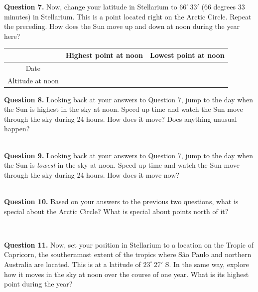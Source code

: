 \documentclass[11pt]{article}
\begin{document}
\textbf{Question 7.} 
Now, change your latitude in Stellarium to $66^\circ\,33'$ (66 degrees 33 minutes) in Stellarium. This is a point located right on the Arctic Circle. Repeat the preceding. How does the 
Sun move up and down at noon during the year here?
\renewcommand{\arraystretch}{2}
\vspace{1cm}
\begin{center}
\begin{tabular}{|c| c |c|}
\hline 
& Highest point at noon & Lowest point at noon \\
\hline
Date & & \\
\hline
Altitude at noon & & \\
\hline
\end{tabular}
\normalsize
\end{center}
\textbf{Question 8.} 
Looking back at your answers to Question 7, jump to the day when the Sun is highest in the sky at noon. Speed up time and watch
the Sun move through the sky during 24 hours. How does it move? Does anything unusual happen?


\vspace*{2cm}
\hrulefill\\


\textbf{Question 9.} 
Looking back at your answers to Question 7, jump to the day when the Sun is {\it lowest} in the sky at noon. Speed up time and watch
the Sun move through the sky during 24 hours. How does it move now?


\vspace*{2cm}
\hrulefill\\


\textbf{Question 10.} 
Based on your answers to the previous two questions, what is special about the Arctic Circle? What is special about points north
of it?

\vspace*{2cm}
\hrulefill\\


\newpage

\textbf{Question 11.} 
Now, set your position in Stellarium to a location on the Tropic of Capricorn, the southernmost extent of the tropics where S\~{a}o Paulo and northern Australia are located.
This is at a latitude of $23^\circ\,27'$ S. In the same way, explore how it moves in the sky at noon over the course of one
year. What is its highest point during the year?

\vspace*{2cm}
\hrulefill\\
\end{document}
